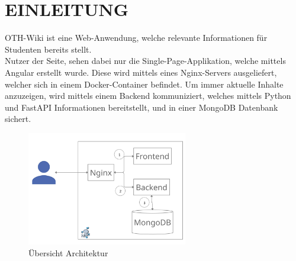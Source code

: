 \section{EINLEITUNG}\label{ch:einleitung}

OTH-Wiki ist eine Web-Anwendung, welche relevante Informationen für Studenten bereits stellt. \\ 
Nutzer der Seite, sehen dabei nur die Single-Page-Applikation, welche mittels Angular erstellt wurde.
Diese wird mittels eines Nginx-Servers ausgeliefert, welcher sich in einem Docker-Container befindet.
Um immer aktuelle Inhalte anzuzeigen, wird mittels einem Backend kommuniziert, welches mittels Python und FastAPI Informationen bereitstellt, und in einer MongoDB Datenbank sichert.
\begin{figure}[!htb]
    \centering
    \includegraphics[width=7cm]{abbildungen/overview_architektur.PNG}
    \caption{Übersicht Architektur}
    \label{fig:arch}
\end{figure} 